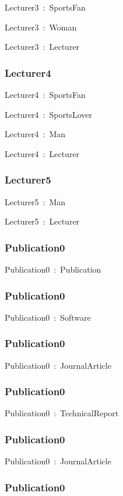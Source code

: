 \documentclass{article}
\begin{document}
Lecturer3~:~SportsFan

Lecturer3~:~Woman

Lecturer3~:~Lecturer

\subsubsection*{Lecturer4}

Lecturer4~:~SportsFan

Lecturer4~:~SportsLover

Lecturer4~:~Man

Lecturer4~:~Lecturer

\subsubsection*{Lecturer5}

Lecturer5~:~Man

Lecturer5~:~Lecturer

\subsubsection*{Publication0}

Publication0~:~Publication

\subsubsection*{Publication0}

Publication0~:~Software

\subsubsection*{Publication0}

Publication0~:~JournalArticle

\subsubsection*{Publication0}

Publication0~:~TechnicalReport

\subsubsection*{Publication0}

Publication0~:~JournalArticle

\subsubsection*{Publication0}
\end{document}
